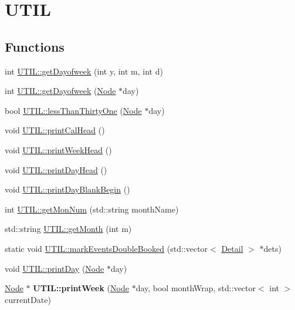 \hypertarget{group__UTIL}{\section{U\-T\-I\-L}
\label{group__UTIL}
}
\subsection*{Functions}
\begin{DoxyCompactItemize}
\item 
int \hyperlink{group__UTIL_gaa9c234531d4ed8848e15458f8fcb377c}{U\-T\-I\-L\-::get\-Dayofweek} (int y, int m, int d)
\item 
int \hyperlink{group__UTIL_ga7a178c29c06227bb28a5b651b8d57908}{U\-T\-I\-L\-::get\-Dayofweek} (\hyperlink{classNode}{Node} $\ast$day)
\item 
bool \hyperlink{group__UTIL_gaefbc24433355f7a87cd9f1a6eeb6393e}{U\-T\-I\-L\-::less\-Than\-Thirty\-One} (\hyperlink{classNode}{Node} $\ast$day)
\item 
void \hyperlink{group__UTIL_gae51cb73bab26a8b09786c55a4491eed0}{U\-T\-I\-L\-::print\-Cal\-Head} ()
\item 
void \hyperlink{group__UTIL_gac9ec4c5a9961d7932fbd04c40c17d110}{U\-T\-I\-L\-::print\-Week\-Head} ()
\item 
void \hyperlink{group__UTIL_gaf42511038942fe8acfd713b8e39de1eb}{U\-T\-I\-L\-::print\-Day\-Head} ()
\item 
void \hyperlink{group__UTIL_ga63005cc2bbe386d0d6def9216246170b}{U\-T\-I\-L\-::print\-Day\-Blank\-Begin} ()
\item 
int \hyperlink{group__UTIL_ga3ae728ca2e986674b59994f39ce12f04}{U\-T\-I\-L\-::get\-Mon\-Num} (std\-::string month\-Name)
\item 
std\-::string \hyperlink{group__UTIL_gaab82a62e4871b62fdf10cec49a8eaa24}{U\-T\-I\-L\-::get\-Month} (int m)
\item 
static void \hyperlink{group__UTIL_ga56218f451bf4a1c2f050eeece129acd7}{U\-T\-I\-L\-::mark\-Events\-Double\-Booked} (std\-::vector$<$ \hyperlink{classDetail}{Detail} $>$ $\ast$dets)
\item 
void \hyperlink{group__UTIL_ga974003737cc9f033ee267c54092af631}{U\-T\-I\-L\-::print\-Day} (\hyperlink{classNode}{Node} $\ast$day)
\item 
\hypertarget{group__UTIL_gab2f2244a22eff0c715737d8236b5b6ce}{\hyperlink{classNode}{Node} $\ast$ {\bfseries U\-T\-I\-L\-::print\-Week} (\hyperlink{classNode}{Node} $\ast$day, bool month\-Wrap, std\-::vector$<$ int $>$ current\-Date)}\label{group__UTIL_gab2f2244a22eff0c715737d8236b5b6ce}

\end{DoxyCompactItemize}
